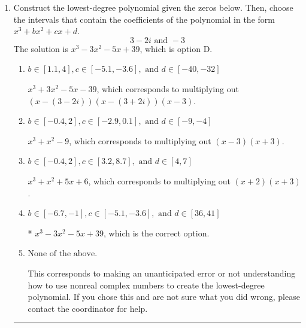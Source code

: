 \documentclass{extbook}[14pt]
\newcommand{\litem}[1]{\item #1

\rule{\textwidth}{0.4pt}}
\begin{document}
\begin{enumerate}\litem{
Construct the lowest-degree polynomial given the zeros below. Then, choose the intervals that contain the coefficients of the polynomial in the form $x^3+bx^2+cx+d$.
\[ 3 - 2 i \text{ and } -3 \]The solution is \( x^{3} -3 x^{2} -5 x + 39 \), which is option D.\begin{enumerate}[label=\Alph*.]
\item \( b \in [1.1, 4], c \in [-5.1, -3.6], \text{ and } d \in [-40, -32] \)

$x^{3} +3 x^{2} -5 x -39$, which corresponds to multiplying out $(x-(3 - 2 i))(x-(3 + 2 i))(x -3)$.
\item \( b \in [-0.4, 2], c \in [-2.9, 0.1], \text{ and } d \in [-9, -4] \)

$x^{3} + x^{2} -9$, which corresponds to multiplying out $(x -3)(x + 3)$.
\item \( b \in [-0.4, 2], c \in [3.2, 8.7], \text{ and } d \in [4, 7] \)

$x^{3} + x^{2} +5 x + 6$, which corresponds to multiplying out $(x + 2)(x + 3)$.
\item \( b \in [-6.7, -1], c \in [-5.1, -3.6], \text{ and } d \in [36, 41] \)

* $x^{3} -3 x^{2} -5 x + 39$, which is the correct option.
\item \( \text{None of the above.} \)

This corresponds to making an unanticipated error or not understanding how to use nonreal complex numbers to create the lowest-degree polynomial. If you chose this and are not sure what you did wrong, please contact the coordinator for help.
\end{enumerate}

}
\end{enumerate}
\end{document}
